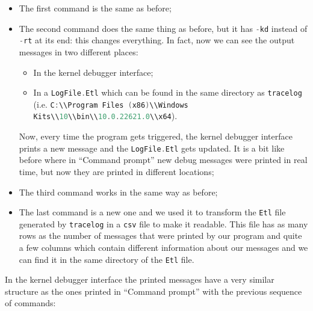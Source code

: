 \begin{itemize}
	\item 
		The first command is the same as before;
	\item 
		The second command does the same thing as before, but it has \colorbox{backcolour}{\lstinline[style=cstyle, language=C]|-kd|} instead of \colorbox{backcolour}{\lstinline[style=cstyle, language=C]|-rt|} at its end: this changes everything.
		In fact, now we can see the output messages in two different places:
		\begin{itemize}
			\item 
				In the kernel debugger interface;
			\item 
				In a \colorbox{backcolour}{\lstinline[style=cstyle, language=C]|LogFile.Etl|} which can be found in the same directory as \colorbox{backcolour}{\lstinline[style=cstyle, language=C]|tracelog|} (i.e. \colorbox{backcolour}{\lstinline[style=cstyle, language=C]|C:\\Program Files (x86)\\Windows Kits\\10\\bin\\10.0.22621.0\\x64|}).
		\end{itemize}
		Now, every time the program gets triggered, the kernel debugger interface prints a new message and the \colorbox{backcolour}{\lstinline[style=cstyle, language=C]|LogFile.Etl|} gets updated.
		It is a bit like before where in ``Command prompt'' new debug messages were printed in real time, but now they are printed in different locations;
	\item 
		The third command works in the same way as before;
	\item 
		The last command is a new one and we used it to transform the \colorbox{backcolour}{\lstinline[style=cstyle, language=C]|Etl|} file generated by \colorbox{backcolour}{\lstinline[style=cstyle, language=C]|tracelog|} in a \colorbox{backcolour}{\lstinline[style=cstyle, language=C]|csv|} file to make it readable.
		This file has as many rows as the number of messages that were printed by our program and quite a few columns which contain different information about our messages and we can find it in the same directory of the \colorbox{backcolour}{\lstinline[style=cstyle, language=C]|Etl|} file.
\end{itemize}

In the kernel debugger interface the printed messages have a very similar structure as the ones printed in ``Command prompt'' with the previous sequence of commands:

